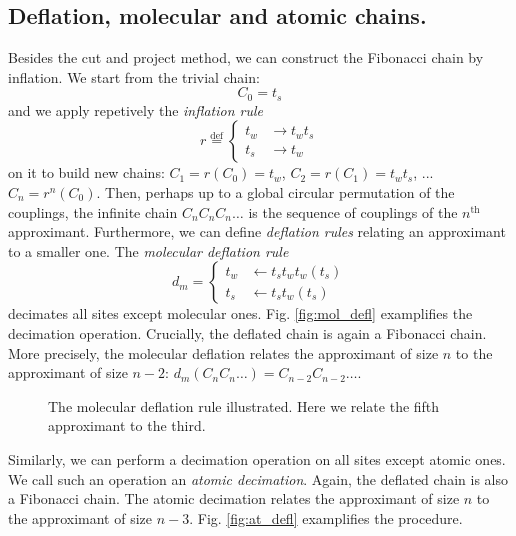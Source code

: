\documentclass[aps,prl,preprint]{revtex4-1}
\newcommand{\define}{\ensuremath{ \overset{\text{def}}{=} }}
\begin{document}
\subsection{Deflation, molecular and atomic chains.}
Besides the cut and project method, we can construct the Fibonacci chain by inflation.
We start from the trivial chain:
\begin{equation}
	C_0 = t_s
\end{equation}
and we apply repetively the \emph{inflation rule}
\begin{equation}
	r \define \begin{cases}
        t_{w} & \rightarrow t_w t_s \\
        t_s & \rightarrow t_w
      \end{cases}
\end{equation} 
on it to build new chains: $C_1 = r(C_0) = t_w$, $C_2 = r(C_1) = t_w t_s$, ... $C_n = r^n(C_0)$.
Then, perhaps up to a global circular permutation of the couplings, the infinite chain $C_n C_n C_n \dots$ is the sequence of couplings of the $n^\text{th}$ approximant.
Furthermore, we can define \emph{deflation rules} relating an approximant to a smaller one.
The \emph{molecular deflation rule}
\begin{equation}
	d_m = \begin{cases}
        t_{w} & \leftarrow t_s t_w t_w (t_s)\\
        t_s & \leftarrow t_s t_w (t_s)
      \end{cases}
\end{equation}
decimates all sites except molecular ones. Fig. \eqref{fig:mol_defl} examplifies the decimation operation.
Crucially, the deflated chain is again a Fibonacci chain. More precisely, the molecular deflation relates the approximant of size $n$ to the approximant of size $n-2$: $d_m(C_n C_n \dots) = C_{n-2} C_{n-2} \dots$.

\begin{figure}[htp]
	
	\caption{The molecular deflation rule illustrated. Here we relate the fifth approximant to the third.}
\label{fig:mol_defl}
\end{figure}

Similarly, we can perform a decimation operation on all sites except atomic ones. We call such an operation an \emph{atomic decimation}.
Again, the deflated chain is also a Fibonacci chain.
The atomic decimation relates the approximant of size $n$ to the approximant of size $n-3$. 
Fig. \eqref{fig:at_defl} examplifies the procedure.
\end{document}
